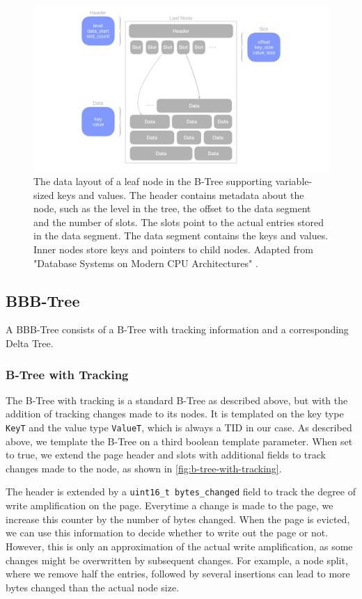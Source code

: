 \begin{figure}[htbp]
  \centering
  \includegraphics[width=1\textwidth]{figures/leaf_node.pdf}
  \caption{The data layout of a leaf node in the B-Tree supporting variable-sized keys and values. The header contains metadata about the node, such as the level in the tree, the offset to the data segment and the number of slots. The slots point to the actual entries stored in the data segment. The data segment contains the keys and values. Inner nodes store keys and pointers to child nodes. Adapted from "Database Systems on Modern CPU Architectures" \autocite{mdbs2024slides}.}
  \label{fig:leaf-node}
\end{figure}

\subsection*{BBB-Tree}

A BBB-Tree consists of a B-Tree with tracking information and a corresponding Delta Tree.

\subsubsection*{B-Tree with Tracking}
The B-Tree with tracking is a standard B-Tree as described above, but with the addition of tracking changes made to its nodes.
It is templated on the key type \texttt{KeyT} and the value type \texttt{ValueT}, which is always a \ac{TID} in our case.
As described above, we template the B-Tree on a third boolean template parameter.
When set to true, we extend the page header and slots with additional fields to track changes made to the node, as shown in \autoref{fig:b-tree-with-tracking}.

The header is extended by a \texttt{uint16\_t bytes\_changed} field to track the degree of write amplification on the page.
Everytime a change is made to the page, we increase this counter by the number of bytes changed.
When the page is evicted, we can use this information to decide whether to write out the page or not.
However, this is only an approximation of the actual write amplification, as some changes might be overwritten by subsequent changes.
For example, a node split, where we remove half the entries, followed by several insertions can lead to more bytes changed than the actual node size.

